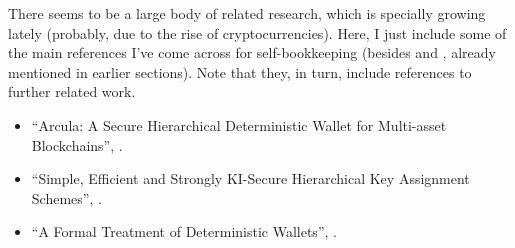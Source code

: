 There seems to be a large body of related research, which is specially
growing lately (probably, due to the rise of cryptocurrencies). Here,
I just include some of the main references I've come across for
self-bookkeeping (besides \cite{kkl20} and \cite{def+21}, already
mentioned in earlier sections). Note that they, in turn, include references
to further related work.

\begin{itemize}
\item ``Arcula: A Secure Hierarchical Deterministic Wallet for Multi-asset
  Blockchains'', \cite{lfa20}.
\item ``Simple, Efficient and Strongly KI-Secure Hierarchical Key Assignment
  Schemes'', \cite{fpp13}.
\item ``A Formal Treatment of Deterministic Wallets'', \cite{dfl19}.
\end{itemize}

